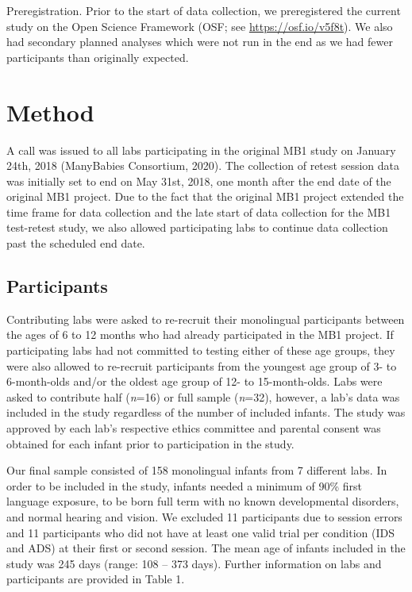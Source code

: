 \documentclass[
  man,floatsintext]{apa6}
\begin{document}
Preregistration. Prior to the start of data collection, we preregistered the current study on the Open Science Framework (OSF; see \url{https://osf.io/v5f8t}). We also had secondary planned analyses which were not run in the end as we had fewer participants than originally expected.

\hypertarget{method}{%
\section{Method}\label{method}}

A call was issued to all labs participating in the original MB1 study on January 24th, 2018 (ManyBabies Consortium, 2020). The collection of retest session data was initially set to end on May 31st, 2018, one month after the end date of the original MB1 project. Due to the fact that the original MB1 project extended the time frame for data collection and the late start of data collection for the MB1 test-retest study, we also allowed participating labs to continue data collection past the scheduled end date.

\hypertarget{participants}{%
\subsection{Participants}\label{participants}}

Contributing labs were asked to re-recruit their monolingual participants between the ages of 6 to 12 months who had already participated in the MB1 project. If participating labs had not committed to testing either of these age groups, they were also allowed to re-recruit participants from the youngest age group of 3- to 6-month-olds and/or the oldest age group of 12- to 15-month-olds. Labs were asked to contribute half (\emph{n}=16) or full sample (\emph{n}=32), however, a lab's data was included in the study regardless of the number of included infants. The study was approved by each lab's respective ethics committee and parental consent was obtained for each infant prior to participation in the study.

Our final sample consisted of 158 monolingual infants from 7 different labs. In order to be included in the study, infants needed a minimum of 90\% first language exposure, to be born full term with no known developmental disorders, and normal hearing and vision. We excluded 11 participants due to session errors and 11 participants who did not have at least one valid trial per condition (IDS and ADS) at their first or second session. The mean age of infants included in the study was 245 days (range: 108 -- 373 days). Further information on labs and participants are provided in Table 1.
\end{document}
